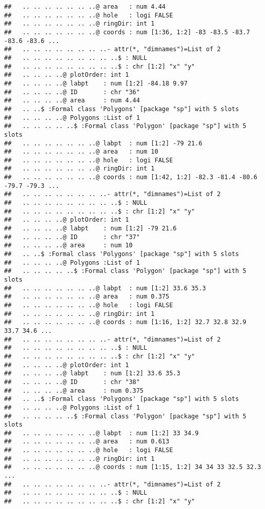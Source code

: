 \documentclass[]{article}
\begin{document}
\begin{verbatim}
##   .. .. .. .. .. .. ..@ area   : num 4.44
##   .. .. .. .. .. .. ..@ hole   : logi FALSE
##   .. .. .. .. .. .. ..@ ringDir: int 1
##   .. .. .. .. .. .. ..@ coords : num [1:36, 1:2] -83 -83.5 -83.7 -83.6 -83.6 ...
##   .. .. .. .. .. .. .. ..- attr(*, "dimnames")=List of 2
##   .. .. .. .. .. .. .. .. ..$ : NULL
##   .. .. .. .. .. .. .. .. ..$ : chr [1:2] "x" "y"
##   .. .. .. ..@ plotOrder: int 1
##   .. .. .. ..@ labpt    : num [1:2] -84.18 9.97
##   .. .. .. ..@ ID       : chr "36"
##   .. .. .. ..@ area     : num 4.44
##   .. ..$ :Formal class 'Polygons' [package "sp"] with 5 slots
##   .. .. .. ..@ Polygons :List of 1
##   .. .. .. .. ..$ :Formal class 'Polygon' [package "sp"] with 5 slots
##   .. .. .. .. .. .. ..@ labpt  : num [1:2] -79 21.6
##   .. .. .. .. .. .. ..@ area   : num 10
##   .. .. .. .. .. .. ..@ hole   : logi FALSE
##   .. .. .. .. .. .. ..@ ringDir: int 1
##   .. .. .. .. .. .. ..@ coords : num [1:42, 1:2] -82.3 -81.4 -80.6 -79.7 -79.3 ...
##   .. .. .. .. .. .. .. ..- attr(*, "dimnames")=List of 2
##   .. .. .. .. .. .. .. .. ..$ : NULL
##   .. .. .. .. .. .. .. .. ..$ : chr [1:2] "x" "y"
##   .. .. .. ..@ plotOrder: int 1
##   .. .. .. ..@ labpt    : num [1:2] -79 21.6
##   .. .. .. ..@ ID       : chr "37"
##   .. .. .. ..@ area     : num 10
##   .. ..$ :Formal class 'Polygons' [package "sp"] with 5 slots
##   .. .. .. ..@ Polygons :List of 1
##   .. .. .. .. ..$ :Formal class 'Polygon' [package "sp"] with 5 slots
##   .. .. .. .. .. .. ..@ labpt  : num [1:2] 33.6 35.3
##   .. .. .. .. .. .. ..@ area   : num 0.375
##   .. .. .. .. .. .. ..@ hole   : logi FALSE
##   .. .. .. .. .. .. ..@ ringDir: int 1
##   .. .. .. .. .. .. ..@ coords : num [1:16, 1:2] 32.7 32.8 32.9 33.7 34.6 ...
##   .. .. .. .. .. .. .. ..- attr(*, "dimnames")=List of 2
##   .. .. .. .. .. .. .. .. ..$ : NULL
##   .. .. .. .. .. .. .. .. ..$ : chr [1:2] "x" "y"
##   .. .. .. ..@ plotOrder: int 1
##   .. .. .. ..@ labpt    : num [1:2] 33.6 35.3
##   .. .. .. ..@ ID       : chr "38"
##   .. .. .. ..@ area     : num 0.375
##   .. ..$ :Formal class 'Polygons' [package "sp"] with 5 slots
##   .. .. .. ..@ Polygons :List of 1
##   .. .. .. .. ..$ :Formal class 'Polygon' [package "sp"] with 5 slots
##   .. .. .. .. .. .. ..@ labpt  : num [1:2] 33 34.9
##   .. .. .. .. .. .. ..@ area   : num 0.613
##   .. .. .. .. .. .. ..@ hole   : logi FALSE
##   .. .. .. .. .. .. ..@ ringDir: int 1
##   .. .. .. .. .. .. ..@ coords : num [1:15, 1:2] 34 34 33 32.5 32.3 ...
##   .. .. .. .. .. .. .. ..- attr(*, "dimnames")=List of 2
##   .. .. .. .. .. .. .. .. ..$ : NULL
##   .. .. .. .. .. .. .. .. ..$ : chr [1:2] "x" "y"

\end{verbatim}
\end{document}
